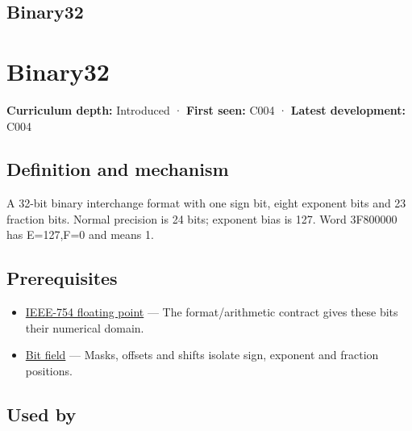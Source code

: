 \hypertarget{appendix-5057f9ad327f}{}
\section*{Binary32}
\chapter{Binary32}\label{appendix-5057f9ad327f-binary32}

\textbf{Curriculum depth:} Introduced · \textbf{First seen:} C004 · \textbf{Latest development:} C004

\section{Definition and mechanism}\label{appendix-5057f9ad327f-definition-and-mechanism}

A 32-bit binary interchange format with one sign bit, eight exponent bits and 23 fraction bits. Normal precision is 24 bits; exponent bias is 127. Word 3F800000 has E=127,F=0 and means 1.

\section{Prerequisites}\label{appendix-5057f9ad327f-prerequisites}

\begin{itemize}
\tightlist
\item
  \hyperref[appendix-343615f49ddf]{IEEE-754 floating point} --- The format/arithmetic contract gives these bits their numerical domain.
\item
  \hyperref[appendix-ac697f5c66e8]{Bit field} --- Masks, offsets and shifts isolate sign, exponent and fraction positions.
\end{itemize}

\section{Used by}\label{appendix-5057f9ad327f-used-by}

